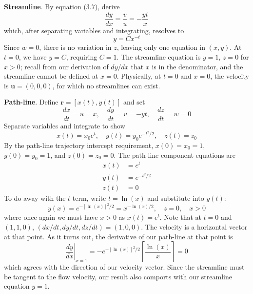 \documentclass[a4paper]{article}
\begin{document}
\vspace{12pt}


\textbf{Streamline}.
By equation (3.7), derive
\[
	\frac{d y}{d x} = \frac{v}{u} = -\frac{yt}{x} 
\]
which, after separating variables and integrating, resolves to
\[
	 y = Cx^{-t}
\]
Since \( w = 0 \), there is no variation in \( z \), leaving only one equation in \( \!\left( x,y \right) \). At \( t = 0 \), we have \( y = C \), requiring \( C = 1 \). The streamline equation is \( y = 1 \), \( z = 0 \) for \( x > 0 \); recall from our derivation of \( dy/dx \) that \( x \) is in the denominator, and the streamline cannot be defined at \( x = 0 \). Physically, at \( t = 0 \) and \( x = 0 \), the velocity is \( \pmb{u} = \!\left( 0,0,0 \right) \), for which no streamlines can exist.

\textbf{Path-line}. Define \( \pmb{r} = \!\left[ x \!\left( t \right),y \!\left( t \right) \right] \) and set 
\[
	\frac{d x}{d t} = u = x, \quad \frac{d y}{d t} = v = -yt, \quad \frac{d z}{d t} = w = 0
\]
Separate variables and integrate to show
\[
	x \!\left( t \right) = x_{0}e^{t}, \quad y \!\left( t \right) = y_{0}e^{-t^{2}/2}, \quad z \!\left( t \right) = z_{0}
\]
By the path-line trajectory intercept requirement, \( x \!\left( 0 \right) = x_{0} = 1 \), \( y \!\left( 0 \right) = y_{0} = 1 \), and \( z \!\left( 0 \right) = z_{0} = 0 \). The path-line component equations are 
\begin{align*}
	x \!\left( t \right) & = e^{t} \\
	y \!\left( t \right) & = e^{-t^{2}/2} \\ 
	z \!\left( t \right) & = 0
\end{align*}
To do away with the \( t \) term, write \( t = \ln\!\left(x\right) \) and substitute into \( y \!\left( t \right) \):
\[
	y \!\left( x \right) = e^{-\!\left[ \ln\!\left(x\right) \right]^{2} / 2} = x^{-\ln\!\left(x\right)/2}, \quad z = 0, \quad x > 0
\]
where once again we must have \( x > 0 \) as \( x \!\left( t \right) = e^{t} \). Note that at \( t = 0 \) and \( \!\left( 1,1,0 \right) \), \( \!\left( dx/dt,dy/dt,dz/dt \right)= \!\left( 1,0,0 \right) \). The velocity is a horizontal vector at that point. As it turns out, the derivative of our path-line at that point is
\[
	\left.\frac{d y}{d x}\right\rvert_{x=1} = -e^{-\!\left[ \ln\!\left(x\right) \right]^{2}/2}\!\left[ \frac{\ln\!\left(x\right)}{x} \right] = 0
\]
which agrees with the direction of our velocity vector. Since the streamline must be tangent to the flow velocity, our result also comports with our streamline equation \( y = 1 \).
\end{document}
